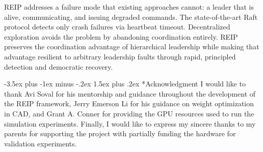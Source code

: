 \documentclass[conference]{IEEEtran}
\makeatletter
\renewcommand{\section}{\@startsection{section}{1}{\z@}%
  {-3.5ex plus -1ex minus -.2ex}%
  {1.5ex plus .2ex}%
  {\normalfont\large\bfseries\centering}}
\makeatother
\begin{document}
REIP addresses a failure mode that existing approaches cannot: a leader that is alive, communicating, and issuing degraded commands. The state-of-the-art Raft protocol detects only crash failures via heartbeat timeout. Decentralized exploration avoids the problem by abandoning coordination entirely. REIP preserves the coordination advantage of hierarchical leadership while making that advantage resilient to arbitrary leadership faults through rapid, principled detection and democratic recovery.

\section*{Acknowledgment}
I would like to thank Avi Soval for his mentorship and guidance throughout the development of the REIP framework, Jerry Emerson Li for his guidance on weight optimization in CAD, and Grant A. Conner for providing the GPU resources used to run the simulation experiments. Finally, I would like to express my sincere thanks to my parents for supporting the project with partially funding the hardware for validation experiments.

\FloatBarrier
\end{document}

